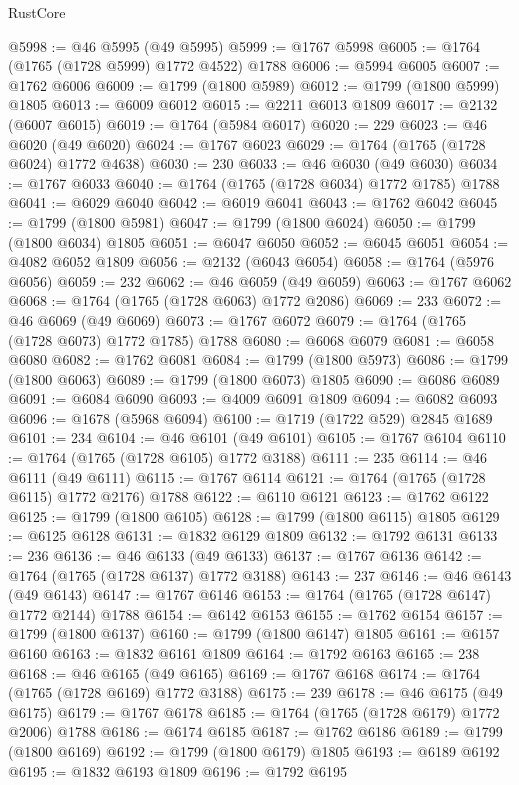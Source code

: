 \begin{lexlean}{RustCore}
\begin{coremodule}
@5998 := @46 @5995 (@49 @5995)
@5999 := @1767 @5998
@6005 := @1764 (@1765 (@1728 @5999) @1772 @4522) @1788
@6006 := @5994 @6005
@6007 := @1762 @6006
@6009 := @1799 (@1800 @5989)
@6012 := @1799 (@1800 @5999) @1805
@6013 := @6009 @6012
@6015 := @2211 @6013 @1809
@6017 := @2132 (@6007 @6015)
@6019 := @1764 (@5984 @6017)
@6020 := 229
@6023 := @46 @6020 (@49 @6020)
@6024 := @1767 @6023
@6029 := @1764 (@1765 (@1728 @6024) @1772 @4638)
@6030 := 230
@6033 := @46 @6030 (@49 @6030)
@6034 := @1767 @6033
@6040 := @1764 (@1765 (@1728 @6034) @1772 @1785) @1788
@6041 := @6029 @6040
@6042 := @6019 @6041
@6043 := @1762 @6042
@6045 := @1799 (@1800 @5981)
@6047 := @1799 (@1800 @6024)
@6050 := @1799 (@1800 @6034) @1805
@6051 := @6047 @6050
@6052 := @6045 @6051
@6054 := @4082 @6052 @1809
@6056 := @2132 (@6043 @6054)
@6058 := @1764 (@5976 @6056)
@6059 := 232
@6062 := @46 @6059 (@49 @6059)
@6063 := @1767 @6062
@6068 := @1764 (@1765 (@1728 @6063) @1772 @2086)
@6069 := 233
@6072 := @46 @6069 (@49 @6069)
@6073 := @1767 @6072
@6079 := @1764 (@1765 (@1728 @6073) @1772 @1785) @1788
@6080 := @6068 @6079
@6081 := @6058 @6080
@6082 := @1762 @6081
@6084 := @1799 (@1800 @5973)
@6086 := @1799 (@1800 @6063)
@6089 := @1799 (@1800 @6073) @1805
@6090 := @6086 @6089
@6091 := @6084 @6090
@6093 := @4009 @6091 @1809
@6094 := @6082 @6093
@6096 := @1678 (@5968 @6094)
@6100 := @1719 (@1722 @529) @2845 @1689
@6101 := 234
@6104 := @46 @6101 (@49 @6101)
@6105 := @1767 @6104
@6110 := @1764 (@1765 (@1728 @6105) @1772 @3188)
@6111 := 235
@6114 := @46 @6111 (@49 @6111)
@6115 := @1767 @6114
@6121 := @1764 (@1765 (@1728 @6115) @1772 @2176) @1788
@6122 := @6110 @6121
@6123 := @1762 @6122
@6125 := @1799 (@1800 @6105)
@6128 := @1799 (@1800 @6115) @1805
@6129 := @6125 @6128
@6131 := @1832 @6129 @1809
@6132 := @1792 @6131
@6133 := 236
@6136 := @46 @6133 (@49 @6133)
@6137 := @1767 @6136
@6142 := @1764 (@1765 (@1728 @6137) @1772 @3188)
@6143 := 237
@6146 := @46 @6143 (@49 @6143)
@6147 := @1767 @6146
@6153 := @1764 (@1765 (@1728 @6147) @1772 @2144) @1788
@6154 := @6142 @6153
@6155 := @1762 @6154
@6157 := @1799 (@1800 @6137)
@6160 := @1799 (@1800 @6147) @1805
@6161 := @6157 @6160
@6163 := @1832 @6161 @1809
@6164 := @1792 @6163
@6165 := 238
@6168 := @46 @6165 (@49 @6165)
@6169 := @1767 @6168
@6174 := @1764 (@1765 (@1728 @6169) @1772 @3188)
@6175 := 239
@6178 := @46 @6175 (@49 @6175)
@6179 := @1767 @6178
@6185 := @1764 (@1765 (@1728 @6179) @1772 @2006) @1788
@6186 := @6174 @6185
@6187 := @1762 @6186
@6189 := @1799 (@1800 @6169)
@6192 := @1799 (@1800 @6179) @1805
@6193 := @6189 @6192
@6195 := @1832 @6193 @1809
@6196 := @1792 @6195

\end{coremodule}
\end{lexlean}
